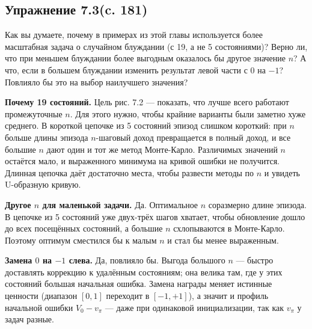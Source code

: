 \subsection{Упражнение 7.3(c. 181)}
Как вы думаете, почему в примерах из этой главы используется более масштабная задача о случайном блуждании (с 19, а не 5 состояниями)? Верно ли, что при меньшем блуждании более выгодным оказалось бы другое значение $n$? А что, если в большем блуждании изменить результат левой части с $0$ на $-1$? Повлияло бы это на выбор наилучшего значения?
\begin{solution}
    \textbf{Почему 19 состояний.} Цель рис. 7.2 --- показать, что лучше всего
    работают промежуточные $n$. Для этого нужно, чтобы крайние варианты были
    заметно хуже среднего. В короткой цепочке из 5 состояний эпизод слишком
    короткий: при $n$ больше длины эпизода $n$-шаговый доход превращается в
    полный доход, и все большие $n$ дают один и тот же метод Монте-Карло.
    Различимых значений $n$ остаётся мало, и выраженного минимума на кривой
    ошибки не получится. Длинная цепочка даёт достаточно места, чтобы развести
    методы по $n$ и увидеть U-образную кривую.
 
    \textbf{Другое $n$ для маленькой задачи.} Да. Оптимальное $n$ соразмерно
    длине эпизода. В цепочке из 5 состояний уже двух-трёх шагов хватает, чтобы
    обновление дошло до всех посещённых состояний, а большие $n$ схлопываются в
    Монте-Карло. Поэтому оптимум сместился бы к малым $n$ и стал бы менее
    выраженным.
 
    \textbf{Замена $0$ на $-1$ слева.} Да, повлияло бы. Выгода большого $n$ ---
    быстро доставлять коррекцию к удалённым состояниям; она велика там, где у
    этих состояний большая начальная ошибка. Замена награды меняет истинные
    ценности (диапазон $[0,1]$ переходит в $[-1,+1]$), а значит и профиль
    начальной ошибки $V_0 - v_\pi$ --- даже при одинаковой инициализации, так
    как $v_\pi$ у задач разные.
\end{solution}

